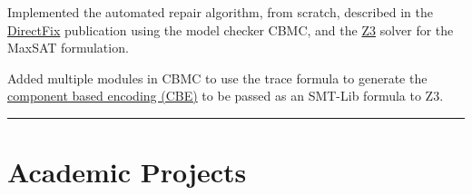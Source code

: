 \documentclass[letterpaper]{Formatting}
\begin{document}
\begin{minipage}[t]{0.66\textwidth}
Implemented the automated repair algorithm, from scratch, described in the \href{https://www.comp.nus.edu.sg/~abhik/pdf/ICSE15-directfix.pdf}{DirectFix} publication using the model checker CBMC, and the \href{https://github.com/Z3Prover/z3}{Z3} solver for the MaxSAT formulation.\vspace{2.5ex}
\footnotesize {
  \begin{tightitemize}
  \item Added multiple modules in CBMC to use the trace formula to generate the \href{http://dl.acm.org/citation.cfm?id=1806833}{component based encoding (CBE)} to be passed as an SMT-Lib formula to Z3.
  \end{tightitemize}
}


\sectionspace
\rule{12cm}{0.5pt}\vspace{2ex}

\section{Academic Projects}

\\\vspace{0.5ex}




\end{minipage}
\end{document}

